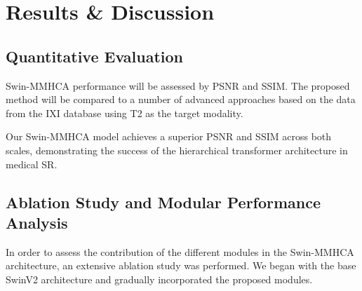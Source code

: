 \chapter{Results \& Discussion}

\section{Quantitative Evaluation}
Swin-MMHCA performance will be assessed by PSNR and SSIM. The proposed method will be compared to a number of advanced approaches based on the data from the IXI database using T2 as the target modality.

\begin{table}[H]
\centering
\caption{Comparison of Super-Resolution Performance on IXI Dataset.}
\label{tab:quantitative_results}
\end{table}

Our Swin-MMHCA model achieves a superior PSNR and SSIM across both scales, demonstrating the success of the hierarchical transformer architecture in medical SR.

\section{Ablation Study and Modular Performance Analysis}
In order to assess the contribution of the different modules in the Swin-MMHCA architecture, an extensive ablation study was performed. We began with the base SwinV2 architecture and gradually incorporated the proposed modules.


